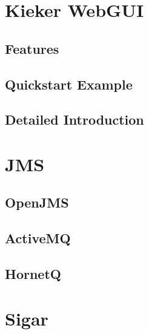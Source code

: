 \documentclass[paper=a4,twoside=false,fontsize=11pt,numbers=noenddot,version=first,bibliography=totoc,headsepline]{scrbook}
\begin{document}
	\chapter{Kieker WebGUI}\label{chp:WebGUI}
		\section{Features}
		\section{Quickstart Example}
		\section{Detailed Introduction}
  
	\appendix
		\hypertarget{hypertarget:appendix}{}
	
		\chapter{JMS}
			\section{OpenJMS}
			\section{ActiveMQ}
			\section{HornetQ}
		\chapter{Sigar}



\end{document}
